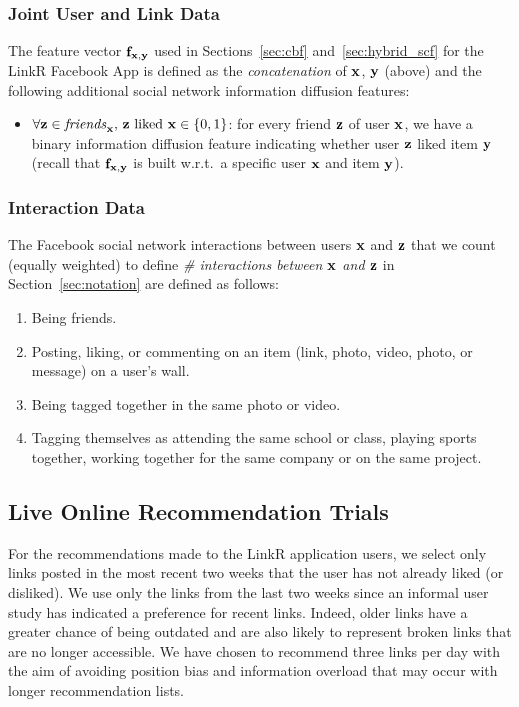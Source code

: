 \subsubsection{Joint User and Link Data}

The feature vector $\mathbf{f}_{\mathbf{x},\mathbf{y}}$ used in Sections~\ref{sec:cbf}
and~\ref{sec:hybrid_scf} for the LinkR Facebook App is defined as the
\emph{concatenation} of $\mathbf{x}$, $\mathbf{y}$ (above) and the following
additional social network information diffusion features:
\begin{itemize}
\item $\forall \mathbf{z} \in \mathit{friends}_{\mathbf{x}}, \, \mbox{$\mathbf{z}$ liked $\mathbf{x}$} \in \{0, 1\}$: for every friend $\mathbf{z}$ of user $\mathbf{x}$, we have a binary information diffusion  feature indicating whether user $\mathbf{z}$ liked item $\mathbf{y}$ (recall that $\mathbf{f}_{\mathbf{x},\mathbf{y}}$ is built w.r.t.\ a specific user $\mathbf{x}$ and item $\mathbf{y}$).
\end{itemize}

\subsubsection{Interaction Data}
\label{sec:interactions}

The Facebook social network interactions between users $\mathbf{x}$ and $\mathbf{z}$ that we count
(equally weighted) to define
\emph{\# interactions between $\mathbf{x}$ and $\mathbf{z}$} in Section~\ref{sec:notation} 
are defined as follows:
\begin{enumerate}
\item{Being friends.}
\item{Posting, liking, or commenting on an item (link, photo, video, photo, or message) on a user's wall.}
\item{Being tagged together in the same photo or video.}
\item{Tagging themselves as attending the same school or class, playing sports together, working together for the same company or on the same project.}
\end{enumerate}

\subsection{Live Online Recommendation Trials}

For the recommendations made to the LinkR application users, we select
only links posted in the most recent two weeks that the user has not
already liked (or disliked).  We use only the links from the last two
weeks since an informal user study has indicated a preference for
recent links.  Indeed, older links have a greater chance of being
outdated and are also likely to represent broken links that are no longer
accessible.  We have chosen to recommend three links per day
with the aim of avoiding position bias and information overload that
may occur with longer recommendation lists.

